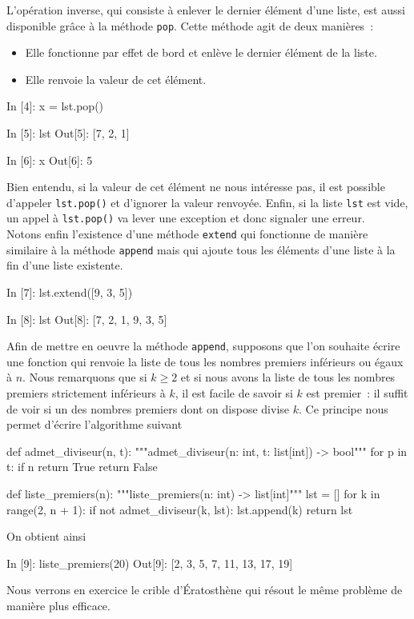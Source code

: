 \documentclass{magnoliaold}
\begin{document}
L'opération inverse, qui consiste à enlever le dernier élément d'une liste, est aussi disponible
grâce à la méthode \verb!pop!. Cette méthode agit de deux manières~:
\begin{itemize}
\item Elle fonctionne par effet de bord et enlève le dernier élément de la liste.
\item Elle renvoie la valeur de cet élément.
\end{itemize}
\begin{pythoncode}
In [4]: x = lst.pop()

In [5]: lst
Out[5]: [7, 2, 1]

In [6]: x
Out[6]: 5
\end{pythoncode}
Bien entendu, si la valeur de cet élément ne nous intéresse pas, il est possible d'appeler
\verb!lst.pop()! et d'ignorer la valeur renvoyée. Enfin, si la liste \verb!lst! est vide, un
appel à \verb!lst.pop()! va lever une exception et donc signaler une erreur.\\

Notons enfin l'existence d'une méthode \verb!extend! qui fonctionne de manière similaire
à la méthode \verb!append! mais qui ajoute tous les éléments d'une liste à la fin
d'une liste existente.
\begin{pythoncode}
In [7]: lst.extend([9, 3, 5])

In [8]: lst
Out[8]: [7, 2, 1, 9, 3, 5]
\end{pythoncode}
\vspace{2ex}

Afin de mettre en oeuvre la méthode \verb!append!,
supposons que l'on souhaite écrire une fonction qui renvoie la liste de tous
les nombres premiers inférieurs ou égaux à $n$. Nous remarquons que si $k\geq 2$ et si
nous avons la liste de tous les nombres premiers strictement inférieurs à $k$, il est
facile de savoir si $k$ est premier~: il suffit de voir si un des nombres premiers
dont on dispose divise $k$. Ce principe nous permet d'écrire l'algorithme suivant

\begin{pythoncode}
def admet_diviseur(n, t):
    """admet_diviseur(n: int, t: list[int]) -> bool"""
    for p in t:
        if n %
            return True
    return False

def liste_premiers(n):
    """liste_premiers(n: int) -> list[int]"""
    lst = []
    for k in range(2, n + 1):
        if not admet_diviseur(k, lst):
            lst.append(k)
    return lst
\end{pythoncode}
\noindent On obtient ainsi
\begin{pythoncode}
In [9]: liste_premiers(20)
Out[9]: [2, 3, 5, 7, 11, 13, 17, 19]
\end{pythoncode}
Nous verrons en exercice le crible d'Ératosthène qui résout le même problème de manière plus efficace.
\end{document}
